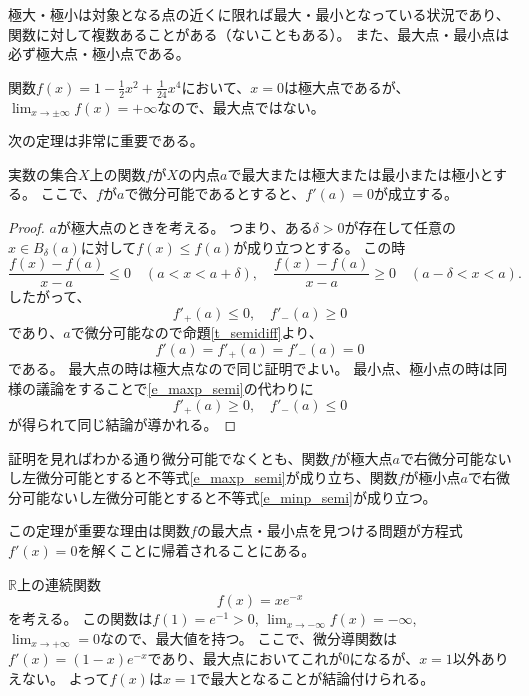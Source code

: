 極大・極小は対象となる点の近くに限れば最大・最小となっている状況であり、関数に対して複数あることがある（ないこともある）。
また、最大点・最小点は必ず極大点・極小点である。

\begin{example}
関数$f(x) = 1-\frac{1}{2}x^2+\frac{1}{24}x^4$において、$x = 0$は極大点であるが、$\lim_{x \to \pm\infty}f(x) = +\infty$なので、最大点ではない。
\end{example}

次の定理は非常に重要である。

\begin{theorem}[最大値原理]
\label{t_maxp}
実数の集合$X$上の関数$f$が$X$の内点$a$で最大または極大または最小または極小とする。
ここで、$f$が$a$で微分可能であるとすると、$f'(a) = 0$が成立する。
\end{theorem}

\begin{proof}
$a$が極大点のときを考える。
つまり、ある$\delta > 0$が存在して任意の$x \in B_\delta(a)$に対して$f(x) \le f(a)$が成り立つとする。
この時
$$
\frac{f(x)-f(a)}{x-a} \le 0 \quad (a < x < a+\delta),
\quad \frac{f(x)-f(a)}{x-a} \ge 0 \quad (a-\delta < x < a).
$$
したがって、
\begin{equation}
\label{e_maxp_semi}
f'_+(a) \le 0,
\quad f'_-(a) \ge 0
\end{equation}
であり、$a$で微分可能なので命題\ref{t_semidiff}より、
$$
f'(a) = f'_+(a) = f'_-(a) = 0
$$
である。
最大点の時は極大点なので同じ証明でよい。
最小点、極小点の時は同様の議論をすることで\eqref{e_maxp_semi}の代わりに
\begin{equation}
\label{e_minp_semi}
f'_+(a) \ge 0,
\quad f'_-(a) \le 0
\end{equation}
が得られて同じ結論が導かれる。
\end{proof}

\begin{remark}
証明を見ればわかる通り微分可能でなくとも、関数$f$が極大点$a$で右微分可能ないし左微分可能とすると不等式\eqref{e_maxp_semi}が成り立ち、関数$f$が極小点$a$で右微分可能ないし左微分可能とすると不等式\eqref{e_minp_semi}が成り立つ。
\end{remark}

この定理が重要な理由は関数$f$の最大点・最小点を見つける問題が方程式$f'(x) = 0$を解くことに帰着されることにある。

\begin{example}
$\mathbb{R}$上の連続関数
$$
f(x) = x e^{-x}
$$
を考える。
この関数は$f(1) = e^{-1} > 0$, $\lim_{x \to -\infty}f(x) = -\infty$, $\lim_{x \to +\infty} = 0$なので、最大値を持つ。
ここで、微分導関数は$f'(x) = (1-x)e^{-x}$であり、最大点においてこれが$0$になるが、$x = 1$以外ありえない。
よって$f(x)$は$x = 1$で最大となることが結論付けられる。
\end{example}


